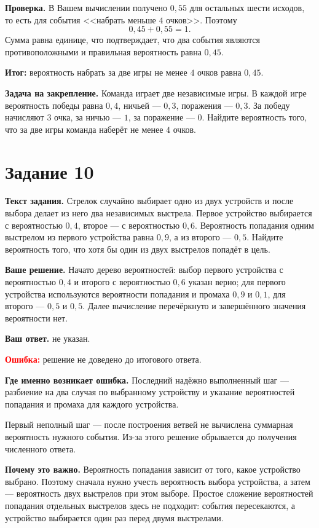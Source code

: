 \documentclass[12pt,a4paper]{article}
\begin{document}
\textbf{Проверка.}
В Вашем вычислении получено $0{,}55$ для остальных шести исходов, то есть для события <<набрать меньше $4$ очков>>. Поэтому
\[
0{,}45+0{,}55=1.
\]
Сумма равна единице, что подтверждает, что два события являются противоположными и правильная вероятность равна $0{,}45$.

\textcolor{teal!60!black}{\textbf{Итог:}} вероятность набрать за две игры не менее $4$ очков равна $0{,}45$.

\textbf{Задача на закрепление.}
Команда играет две независимые игры. В каждой игре вероятность победы равна $0{,}4$, ничьей --- $0{,}3$, поражения --- $0{,}3$. За победу начисляют $3$ очка, за ничью --- $1$, за поражение --- $0$. Найдите вероятность того, что за две игры команда наберёт не менее $4$ очков.

\newpage
{}\label{task:10}
\section*{Задание 10}

\textbf{Текст задания.}
Стрелок случайно выбирает одно из двух устройств и после выбора делает из него два независимых выстрела. Первое устройство выбирается с вероятностью $0{,}4$, второе --- с вероятностью $0{,}6$. Вероятность попадания одним выстрелом из первого устройства равна $0{,}9$, а из второго --- $0{,}5$. Найдите вероятность того, что хотя бы один из двух выстрелов попадёт в цель.

\textbf{Ваше решение.}
Начато дерево вероятностей: выбор первого устройства с вероятностью $0{,}4$ и второго с вероятностью $0{,}6$ указан верно; для первого устройства используются вероятности попадания и промаха $0{,}9$ и $0{,}1$, для второго --- $0{,}5$ и $0{,}5$. Далее вычисление перечёркнуто и завершённого значения вероятности нет.

\textbf{Ваш ответ.} не указан.

\textcolor{red}{\textbf{Ошибка:}} решение не доведено до итогового ответа.

\textbf{Где именно возникает ошибка.}
Последний надёжно выполненный шаг --- разбиение на два случая по выбранному устройству и указание вероятностей попадания и промаха для каждого устройства.

Первый неполный шаг --- после построения ветвей не вычислена суммарная вероятность нужного события. Из-за этого решение обрывается до получения численного ответа.

\textbf{Почему это важно.}
Вероятность попадания зависит от того, какое устройство выбрано. Поэтому сначала нужно учесть вероятность выбора устройства, а затем --- вероятность двух выстрелов при этом выборе. Простое сложение вероятностей попадания отдельных выстрелов здесь не подходит: события пересекаются, а устройство выбирается один раз перед двумя выстрелами.
\end{document}
